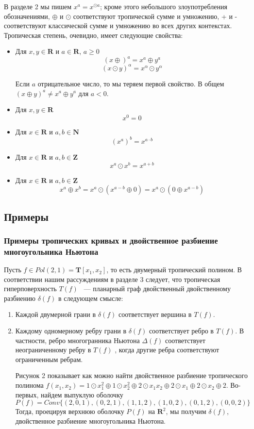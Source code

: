 \documentclass[russian]{lecture-notes}
\begin{document}
	В разделе 2 мы пишем $x^a = x^{\odot a}$; кроме этого небольшого злоупотребления обозначениями, $\oplus$ и $\odot$ соответствуют тропической сумме и умножению, + и - соответствуют классической сумме и умножению во всех других контекстах. Тропическая степень, очевидно, имеет следующие свойства: 
	\begin{itemize}
		\item Для $x, y \in \mathbf{R}$ и $a \in \mathbf{R}$, $a \geq 0$
		\[
			(x \oplus)^a = x^a \oplus y^a
		\]
		\[
			(x \odot y)^\alpha = x^\alpha \odot y^\alpha
		\]
		
		Если $a$ отрицательное число, то мы теряем первой свойство. В общем $(x \oplus y)^a \ne x^a \oplus y^a$ для $a < 0$. 
		\item Для $x,y \in \mathbf{R}$
		\[
			x^0 = 0
		\]
		\item Для $x \in \mathbf{R}$ и $a,b \in \mathbf{N}$
		\[
			(x^a)^b = x^{a\cdot b}
		\]
		\item Для $x \in \mathbf{R}$ и $a,b \in \mathbf{Z}$
		\[
			x^a \odot x^b = x^{a+b}
		\]
		\item Для $x \in \mathbf{R}$ и $a,b \in \mathbf{Z}$
		\[
			x^a \oplus x^b = x^a \odot(x^{a-b}\oplus 0) = x^a \odot (0\oplus x^{a-b})
		\]
	\end{itemize}
	\subsection{Примеры}
	\subsubsection{Примеры тропических кривых и двойственное разбиение многоугольника Ньютона}
	
	Пусть $f \in Pol(2,1) = \mathbf{T}[x_1,x_2]$, то есть двумерный тропический полином. В соответствии нашим рассуждениям в разделе 3 следует, что тропическая гиперповерхность $T(f)$ ~--- планарный граф двойственный двойственному разбиению $\delta (f)$ в следующем смысле:
	\begin{enumerate}
		\item  Каждой двумерной грани в $\delta (f)$ соответствует вершина в $T(f)$.
		\item Каждому одномерному ребру грани в $\delta (f)$  соответствует ребро в $T(f)$. В частности, ребро многогранника Ньютона $\Delta (f)$ соответствует неограниченному ребру в $T(f)$ , когда другие ребра соответствуют ограниченным ребрам.
		
	Рисунок 2 показывает как можно найти двойственное разбиение тропического полинома $f(x_1,x_2) = 1 \odot x_1^2\oplus 1 \odot x^2_2\oplus 2 \odot x_1x_2 \oplus 2 \odot x_1 \oplus 2 \odot x_2 \oplus 2$. Во-первых, найдем выпуклую оболочку 
	\[
		P(f) = Conv\{(2,0,1),(0,2,1),(1,1,2),(1,0,2),(0,1,2),(0,0,2)\}
	\]
	Тогда, проецируя верхнюю оболочку $P(f)$ на $\mathbf{R}^2$, мы получим $\delta(f)$, двойственное разбиение многоугольника Ньютона.
	\end{enumerate}
\end{document}
